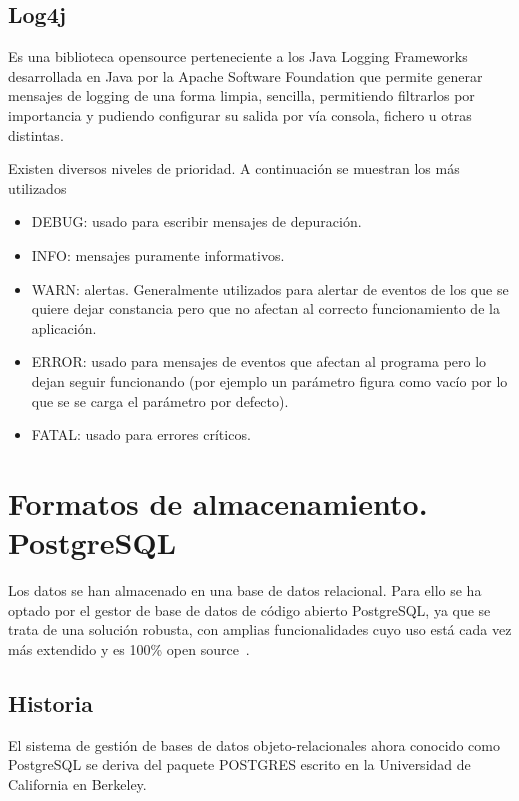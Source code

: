 \subsection{Log4j}
 Es una biblioteca \gls{opensource} perteneciente a los Java Logging Frameworks desarrollada en Java por la Apache Software Foundation que permite generar mensajes de logging de una forma limpia, sencilla, permitiendo filtrarlos por importancia y pudiendo configurar su salida por vía consola, fichero u otras distintas.

Existen diversos niveles de prioridad. A continuación se muestran los más utilizados
\begin{itemize}
\item DEBUG: usado para escribir mensajes de depuración.
\item INFO: mensajes puramente informativos.
\item WARN: alertas. Generalmente utilizados para alertar de eventos de los que se quiere dejar constancia pero que no afectan al correcto funcionamiento de la aplicación.
\item ERROR: usado para mensajes de eventos que afectan al programa pero lo dejan seguir funcionando (por ejemplo un parámetro figura como vacío por lo que se se carga el parámetro por defecto).
\item FATAL: usado para errores críticos. 
\end{itemize}  
  
    


\section{Formatos de almacenamiento. PostgreSQL}
\label{sec:almacenamiento}

Los datos se han almacenado en una base de datos relacional. Para ello se ha optado por el gestor de base de datos de código abierto PostgreSQL, ya que se trata de una solución robusta, con amplias funcionalidades cuyo uso está cada vez más extendido y es 100\% open source~\cite{Postgresql}.


\subsection{Historia}
\label{sec:historiapsql}

El sistema de gestión de bases de datos objeto-relacionales ahora conocido como PostgreSQL se deriva del paquete POSTGRES escrito en la Universidad de California en Berkeley.

